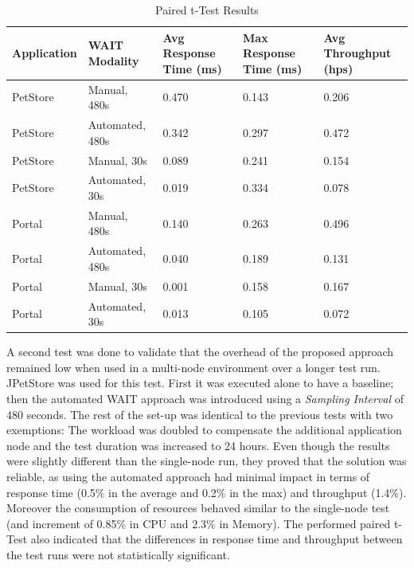 \documentclass[runningheads,a4paper]{llncs}
\begin{document}
\begin{table}[!h]
\caption{Paired t-Test Results}
\label{tTest1}
\centering
\begin{tabular}{p{}|p{}|p{}|p{}|p{}}
\hline
\bfseries Application & \bfseries WAIT Modality & \bfseries Avg Response Time
(ms)& \bfseries Max Response Time (ms)& \bfseries Avg Throughput (hps)\\
\hline
PetStore & 	Manual, 480s 			& 0.470 & 0.143	& 0.206\\
PetStore & 	Automated, 480s 		& 0.342	& 0.297	& 0.472\\
PetStore & 	Manual, 30s 			& 0.089	& 0.241	& 0.154\\
PetStore & 	Automated, 30s 			& 0.019	& 0.334	& 0.078\\
\hline
Portal 	& 	Manual, 480s 			& 0.140 & 0.263	& 0.496\\
Portal 	& 	Automated, 480s 		& 0.040	& 0.189	& 0.131\\
Portal 	& 	Manual, 30s 			& 0.001	& 0.158	& 0.167\\
Portal 	& 	Automated, 30s 			& 0.013	& 0.105	& 0.072\\
\hline
\end{tabular}
\end{table}

A second test was done to validate that the overhead of the proposed approach
remained low when used in a multi-node environment over a longer test run.
JPetStore was used for this test. First it was executed alone to have a
baseline; then the automated WAIT approach was introduced using a \emph{Sampling
Interval} of 480 seconds. The rest of the set-up was identical to the previous
tests with two exemptions: The workload was doubled to compensate the additional
application node and the test duration was increased to 24 hours. Even though
the results were slightly different than the single-node run, they proved that
the solution was reliable, as using the automated approach had minimal impact in
terms of response time (0.5\% in the average and 0.2\% in the max) and
throughput (1.4\%). Moreover the consumption of resources behaved similar to the
single-node test (and increment of 0.85\% in CPU and 2.3\% in Memory).
The performed paired t-Test also indicated that the differences in response time
and throughput between the test runs were not statistically significant.
\end{document}
